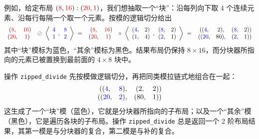 例如，给定布局 $(\textcolor{red}{8},\textcolor{red}{16}):(\textcolor{red}{20},\textcolor{red}{1})$，我们想抽取一个“块”：沿每列向下取 4 个连续元素、沿每行每隔一个取一个元素。按模的逻辑切分给出
\begin{align*}
\begin{array}{cc} (\textcolor{red}{8}, & \textcolor{red}{16})\\
                  (\textcolor{red}{20},& \textcolor{red}{1}) \end{array}
\ \oslash \
\left\langle
\begin{array}{c} \textcolor{blue}{4} \\ \textcolor{blue}{1} \end{array},
\begin{array}{c} \textcolor{blue}{8} \\ \textcolor{blue}{2} \end{array}
\right\rangle
\ = \
\begin{array}{cc} (\textcolor{red}{8}, & \textcolor{red}{16}) \\ (\textcolor{red}{20}, & \textcolor{red}{1}) \end{array}
\ \circ \
\left\langle
\begin{array}{cc} (\textcolor{blue}{4}, & \textcolor{black}{2}) \\ (\textcolor{blue}{1}, & \textcolor{black}{4}) \end{array},
\begin{array}{cc} (\textcolor{blue}{8}, & \textcolor{black}{2}) \\ (\textcolor{blue}{2}, & \textcolor{black}{1}) \end{array}
\right\rangle
\ = \
\begin{array}{cccc}((\textcolor{blue}{4}, & \textcolor{black}{2}), & (\textcolor{blue}{8}, & \textcolor{black}{2})) \\ ((\textcolor{blue}{20}, & \textcolor{black}{80}), & (\textcolor{blue}{2}, & \textcolor{black}{1})) \end{array}
\end{align*}
其中“块”模标为蓝色，“其余”模标为黑色。结果布局仍保持 $8 {\times} 16$，而分块器所指向的元素已被置换到最前面的 $4 {\times} 8$ 块中。

操作 {\tt zipped\_divide} 先按模做逻辑切分，再把同类模拉链式地组合在一起：
\begin{align*}
\begin{array}{cccc}((\textcolor{blue}{4}, & \textcolor{blue}{8}), & (\textcolor{black}{2}, & \textcolor{black}{2})) \\ ((\textcolor{blue}{20}, & \textcolor{blue}{2}), & (\textcolor{black}{80}, & \textcolor{black}{1})) \end{array}
\end{align*}
这生成了一个“块”模（蓝色），它就是分块器所指向的子布局；以及一个“其余”模（黑色），它是遍历各块的子布局。操作 {\tt zipped\_divide} 总是返回一个 2 阶布局结果，其第一模是与分块器的复合，第二模是与补的复合。

